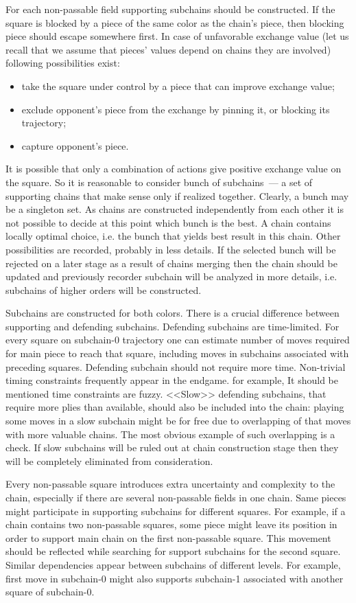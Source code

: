 \documentclass{llncs}
\begin{document}
For each non-passable field supporting subchains should be
constructed. If the square is blocked by a piece of the same color as
the chain's piece, then blocking piece should escape somewhere
first. In case of unfavorable exchange value (let us recall that we
assume that pieces' values depend on chains they are involved)
following possibilities exist:
\begin{itemize}
\item take the square under control by a piece that can improve exchange value;
\item exclude opponent's piece from the exchange by pinning it, or blocking its trajectory;
\item capture opponent's piece.
\end{itemize}
It is possible that only a combination of actions give positive
exchange value on the square. So it is reasonable to consider bunch of
subchains~--- a set of supporting chains that make sense only if
realized together. Clearly, a bunch may be a singleton set. As chains
are constructed independently from each other it is not possible to
decide at this point which bunch is the best. A chain contains locally
optimal choice, i.e. the bunch that yields best result in this
chain. Other possibilities are recorded, probably in less details. If
the selected bunch will be rejected on a later stage as a result of
chains merging then the chain should be updated and previously
recorder subchain will be analyzed in more details, i.e. subchains of
higher orders will be constructed.

Subchains are constructed for both colors. There is a crucial
difference between supporting and defending subchains. Defending
subchains are time-limited. For every square on subchain-0 trajectory
one can estimate number of moves required for main piece to reach that
square, including moves in subchains associated with preceding
squares. Defending subchain should not require more time. Non-trivial
timing constraints frequently appear in the endgame.  for example, It
should be mentioned time constraints are fuzzy. <<Slow>> defending
subchains, that require more plies than available, should also be
included into the chain: playing some moves in a slow subchain might
be for free due to overlapping of that moves with more valuable
chains. The most obvious example of such overlapping is a check. If
slow subchains will be ruled out at chain construction stage then they
will be completely eliminated from consideration.

Every non-passable square introduces extra uncertainty and complexity
to the chain, especially if there are several non-passable fields in
one chain. Same pieces might participate in supporting subchains for
different squares. For example, if a chain contains two non-passable
squares, some piece might leave its position in order to support main
chain on the first non-passable square. This movement should be
reflected while searching for support subchains for the second
square. Similar dependencies appear between subchains of different
levels. For example, first move in subchain-0 might also supports
subchain-1 associated with another square of subchain-0.
\end{document}
